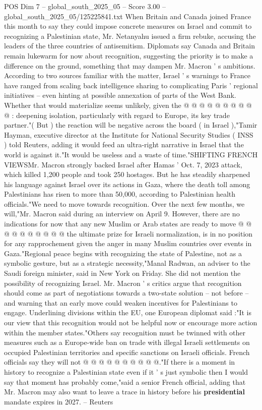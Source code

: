 \begin{textsample}{POS Dim 7 – global\_south\_2025\_05 – Score 3.00 – global\_south\_2025\_05/125225841.txt}
When Britain and Canada joined France this month to say they could impose concrete measures on Israel and commit to recognizing a Palestinian state, Mr.
Netanyahu issued a firm rebuke, accusing the leaders of the three countries of antisemitism.
Diplomats say Canada and Britain remain lukewarm for now about recognition, suggesting the priority is to make a difference on the ground, something that may dampen Mr.
Macron ' s ambitions.
According to two sources familiar with the matter, Israel ' s warnings to France have ranged from scaling back intelligence sharing to complicating Paris ' regional initiatives -- even hinting at possible annexation of parts of the West Bank.
Whether that would materialize seems unlikely, given the @ @ @ @ @ @ @ @ @ @ : deepening isolation, particularly with regard to Europe, its key trade partner."( But ) the reaction will be negative across the board ( in Israel ),"Tamir Hayman, executive director at the Institute for National Security Studies ( INSS ) told Reuters, adding it would feed an ultra-right narrative in Israel that the world is against it."It would be useless and a waste of time."SHIFTING FRENCH VIEWSMr.
Macron strongly backed Israel after Hamas ' Oct. 7, 2023 attack, which killed 1,200 people and took 250 hostages.
But he has steadily sharpened his language against Israel over its actions in Gaza, where the death toll among Palestinians has risen to more than 50,000, according to Palestinian health officials."We need to move towards recognition.
Over the next few months, we will,"Mr.
Macron said during an interview on April 9.
However, there are no indications for now that any new Muslim or Arab states are ready to move @ @ @ @ @ @ @ @ @ @ the ultimate prize for Israeli normalization, is in no position for any rapprochement given the anger in many Muslim countries over events in Gaza."Regional peace begins with recognizing the state of Palestine, not as a symbolic gesture, but as a strategic necessity,"Manal Radwan, an adviser to the Saudi foreign minister, said in New York on Friday.
She did not mention the possibility of recognizing Israel.
Mr.
Macron ' s critics argue that recognition should come as part of negotiations towards a two-state solution -- not before -- and warning that an early move could weaken incentives for Palestinians to engage.
Underlining divisions within the EU, one European diplomat said :"It is our view that this recognition would not be helpful now or encourage more action within the member states."Others say recognition must be twinned with other measures such as a Europe-wide ban on trade with illegal Israeli settlements on occupied Palestinian territories and specific sanctions on Israeli officials.
French officials say they will not @ @ @ @ @ @ @ @ @ @."If there is a moment in history to recognize a Palestinian state even if it ' s just symbolic then I would say that moment has probably come,"said a senior French official, adding that Mr.
Macron may also want to leave a trace in history before his \textbf{presidential} mandate expires in 2027. -- Reuters

\end{textsample}
